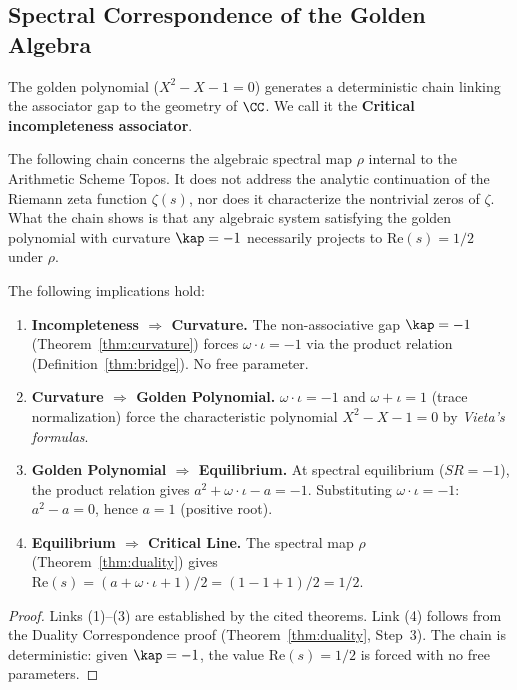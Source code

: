 \subsection{Spectral Correspondence of the Golden Algebra}

The golden polynomial ($X^2 - X - 1 = 0$) generates a deterministic chain linking the associator gap to the geometry of $\CC$. We call it the \textbf{Critical incompleteness associator}.

\begin{remark}
The following chain concerns the algebraic spectral map $\rho$ internal to the Arithmetic Scheme Topos. It does not address the analytic continuation of the Riemann zeta function $\zeta(s)$, nor does it characterize the nontrivial zeros of $\zeta$. What the chain shows is that any algebraic system satisfying the golden polynomial with curvature $\kap = -1$ necessarily projects to $\mathrm{Re}(s) = 1/2$ under $\rho$.
\end{remark}

\begin{theorem}\label{thm:spectral-chain}
The following implications hold:
\begin{enumerate}
\item \textbf{Incompleteness $\Rightarrow$ Curvature.} The non-associative gap $\kap = -1$ (Theorem~\ref{thm:curvature}) forces $\omega \cdot \iota = -1$ via the product relation (Definition~\ref{thm:bridge}). No free parameter.
\item \textbf{Curvature $\Rightarrow$ Golden Polynomial.} $\omega \cdot \iota = -1$ and $\omega + \iota = 1$ (trace normalization) force the characteristic polynomial $X^2 - X - 1 = 0$ by \emph{Vieta's formulas}.
\item \textbf{Golden Polynomial $\Rightarrow$ Equilibrium.} At spectral equilibrium ($SR = -1$), the product relation gives $a^2 + \omega \cdot \iota - a = -1$. Substituting $\omega \cdot \iota = -1$: $a^2 - a = 0$, hence $a = 1$ (positive root).
\item \textbf{Equilibrium $\Rightarrow$ Critical Line.} The spectral map $\rho$ (Theorem~\ref{thm:duality}) gives $\mathrm{Re}(s) = (a + \omega \cdot \iota + 1)/2 = (1 - 1 + 1)/2 = 1/2$.
\end{enumerate}
\end{theorem}

\begin{proof}
Links (1)--(3) are established by the cited theorems. Link (4) follows from the Duality Correspondence proof (Theorem~\ref{thm:duality}, Step~3). The chain is deterministic: given $\kap = -1$, the value $\mathrm{Re}(s) = 1/2$ is forced with no free parameters. \qedhere
\end{proof}


